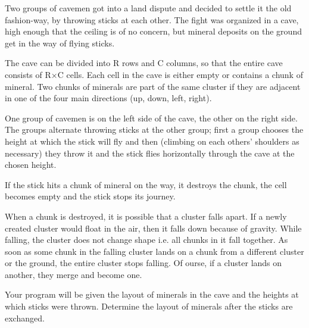 Two groups of cavemen got into a land dispute and decided to settle it the old fashion-way, by throwing sticks at each other. The fight was organized in a cave, high enough that the ceiling is of no concern, but mineral deposits on the ground get in the way of flying sticks.  

   The cave can be divided into R rows and C columns, so that the entire cave consists of R×C cells. Each cell in the cave is either empty or contains a chunk of mineral. Two chunks of minerals are part of the same cluster if they are adjacent in one of the four main directions (up, down, left, right).  

   One group of cavemen is on the left side of the cave, the other on the right side. The groups alternate throwing sticks at the other group; first a group chooses the height at which the stick will fly and then (climbing on each others' shoulders as necessary) they throw it and the stick flies horizontally through the cave at the chosen height.  

   If the stick hits a chunk of mineral on the way, it destroys the chunk, the cell becomes empty and the stick stops its journey.  

   When a chunk is destroyed, it is possible that a cluster falls apart. If a newly created cluster would float in the air, then it falls down because of gravity. While falling, the cluster does not change shape i.e. all chunks in it fall together. As soon as some chunk in the falling cluster lands on a chunk from a different cluster or the ground, the entire cluster stops falling. Of  ourse, if a cluster lands on another, they merge and become one.  

   Your program will be given the layout of minerals in the cave and the heights at which sticks were thrown. Determine the layout of minerals after the sticks are exchanged.  

\